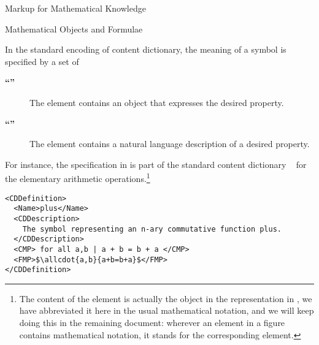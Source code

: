 \begin{omgroup}[id=math-markup]{Markup for Mathematical Knowledge}
\begin{omgroup}[id=math-objects]{Mathematical Objects and Formulae}
\begin{omgroup}[id=math-markup:openmath]{\openmath}
  In the standard encoding of {\openmath} content dictionary, the meaning of a symbol is
  specified by a set of
  \begin{description}
  \item[{\bf{``''}}] The
    {} element contains an {\openmath} object that expresses the
    desired property.
  \item[{\bf{``''}}] The
    {} element contains a natural language description of a
    desired property.
  \end{description}
  For instance, the specification in {} is part of the standard
  {\openmath} content dictionary {}~\cite{URL:omcd-core} for the
  elementary arithmetic operations.\footnote{The content of the
    {} element is actually the {\openmath} object in the
    representation in {}, we have abbreviated it here in the usual
    mathematical notation, and we will keep doing this in the remaining document: wherever
    an {\xml} element in a figure contains mathematical notation, it stands for the
    corresponding {\openmath} element.}
\begin{lstlisting}[label=lst:arith1,language=omCD,mathescape,
  caption={Part of the {\sc OpenMath} Content Dictionary {\snippet{arith1}}.},
  index={CDDefinition,Name,dc:description,CMP,FMP}]
<CDDefinition>
  <Name>plus</Name> 
  <CDDescription>
    The symbol representing an n-ary commutative function plus.
  </CDDescription> 
  <CMP> for all a,b | a + b = b + a </CMP>
  <FMP>$\allcdot{a,b}{a+b=b+a}$</FMP> 
</CDDefinition>
\end{lstlisting}


\end{omgroup}
\end{omgroup}
\end{omgroup}
